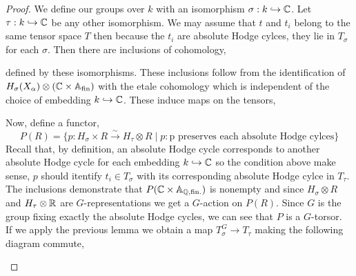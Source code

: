 \documentclass[12pt]{article}
\begin{document}
\begin{proof}
We define our groups over $k$ with an isomorphism $\sigma : k \hookrightarrow \mathbb{C}$. Let $\tau : k \hookrightarrow \mathbb{C}$ be any other isomorphism. We may assume that $t$ and $t_i$ belong to the same tensor space $T$ then because the $t_i$ are absolute Hodge cylces, they lie in $T_\sigma$ for each $\sigma$. Then there are inclusions of cohomology,
\begin{center}
\end{center}
defined by these isomorphisms. These inclusions follow from the identification of $H_\sigma(X_\alpha) \otimes (\mathbb{C} \times \mathbb{A}_{\text{fin}})$ with the etale cohomology which is independent of the choice of embedding $k \hookrightarrow \mathbb{C}$. These induce maps on the tensors,
\begin{center}
\end{center}
Now, define a functor,
\[ P(R) = \{ p : H_\sigma \times R \xrightarrow{\sim} H_\tau \otimes R \mid p : \text{p preserves each absolute Hodge cylces} \} \]
Recall that, by definition, an absolute Hodge cycle corresponds to another absolute Hodge cycle for each embedding $k \hookrightarrow \mathbb{C}$ so the condition above make sense, $p$ should itentify $t_i \in T_\sigma$ with its corresponding absolute Hodge cylce in $T_\tau$. 
\bigskip\\
The inclusions demonstrate that $P(\mathbb{C} \times \mathbb{A}_{\mathbb{Q}, \text{fin}.})$ is nonempty and since $H_\sigma \otimes R$ and $H_\tau \otimes \mathbb{R}$ are $G$-representations we get a $G$-action on $P(R)$. Since $G$ is the group fixing exactly the absolute Hodge cycles, we can see that $P$ is a $G$-torsor.
\bigskip\\
If we apply the previous lemma we obtain a map $T^G_\sigma \to T_\tau$ making the following diagram commute,
\begin{center}

\end{center}
\end{proof}
\end{document}

